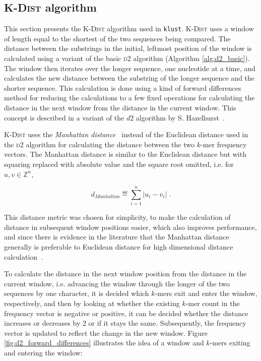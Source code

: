 \subsection{\textsc{K-Dist} algorithm}

This section presents the \textsc{K-Dist} algorithm used in \texttt{klust}.
\textsc{K-Dist} uses a window of length equal to the shortest of the two
sequences being compared. The distance between the substrings in the initial,
leftmost position of the window is calculated using a variant of the basic
\textsc{d2} algorithm (Algorithm \ref{alg:d2_basic}). The window then iterates
over the longer sequence, one nucleotide at a time, and calculates the new
distance between the substring of the longer sequence and the shorter
sequence.  This calculation is done using a kind of forward differences method
for reducing the calculations to a few fixed operations for calculating the
distance in the next window from the distance in the current window. This
concept is described in a variant of the $d2$ algorithm by S.
Hazelhurst~\cite{hazelhurst}.

\textsc{K-Dist} uses the \emph{Manhattan distance}~\cite{upton} instead of the
Euclidean distance used in the \textsc{d2} algorithm for calculating the
distance between the two $k$-mer frequency vectors. The Manhattan distance is
similar to the Euclidean distance but with squaring replaced with absolute
value and the square root omitted, i.e.  for $u, v \in \mathbb{Z}^n$,

\begin{equation*}
  d_{Manhattan} \eqdef \sum_{i=1}^{n} |u_i - v_i| \;.
\end{equation*}

This distance metric was chosen for simplicity, to make the calculation of
distance in subsequent window positions easier, which also improves
performance, and since there is evidence in the literature that the Manhattan
distance generally is preferable to Euclidean distance for high dimensional
distance calculation~\cite{aggarwal}. 

To calculate the distance in the next window position from the distance in the
current window, i.e. advancing the window through the longer of the two
sequences by one character, it is decided which $k$-mers exit and enter the
window, respectively, and then by looking at whether the existing $k$-mer count
in the frequency vector is negative or positive, it can be decided whether the
distance increases or decreases by 2 or if it stays the same.
Subsequently, the frequency vector is updated to reflect the change in the new
window. Figure \ref{fig:d2_forward_differences} illustrates the idea of a
window and $k$-mers exiting and entering the window:

